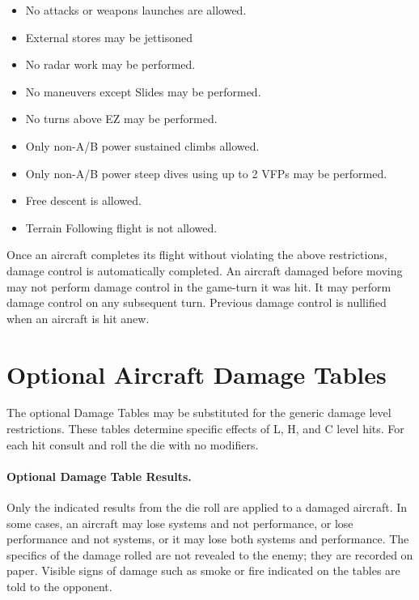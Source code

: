 \begin{advancedrules}
\begin{itemize}
    \item No attacks or weapons launches are allowed.
    \item External stores may be jettisoned
    \item No radar work may be performed.
    \item No maneuvers except Slides may be performed.
    \item No turns above EZ may be performed.
    \item Only non-A/B power sustained climbs allowed.
    \item Only non-A/B power steep dives using up to 2 VFPs may be performed.
    \item Free descent is allowed.
    \item Terrain Following flight is not allowed.
\end{itemize}

Once an aircraft completes its flight without violating the above restrictions, damage control is automatically completed. An aircraft damaged before moving may not perform damage control in the game-turn it was hit. It may perform damage control on any subsequent turn. Previous damage control is nullified when an aircraft is hit anew.

\section{Optional Aircraft Damage Tables}


The optional Damage Tables may be substituted for the generic damage level restrictions. These tables determine specific effects of L, H, and C level hits. For each hit consult  and roll the die with no modifiers.  

\paragraph{Optional Damage Table Results.} Only the indicated results from the die roll are applied to a damaged aircraft. In some cases, an aircraft may lose systems and not performance, or lose performance and not systems, or it may lose both systems and performance. The specifics of the damage rolled are not revealed to the enemy; they are recorded on paper. Visible signs of damage such as smoke or fire indicated on the tables are told to the opponent.


\end{advancedrules}
